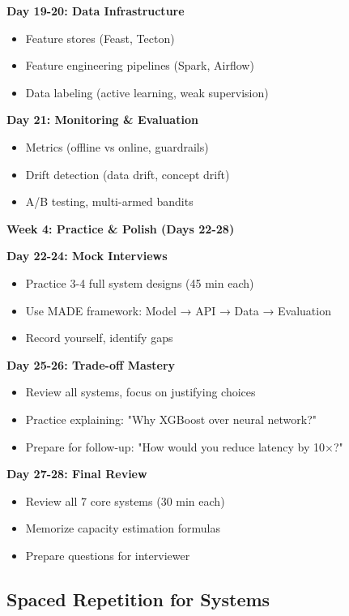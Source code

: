 \documentclass[10pt]{article}
\begin{document}
\textbf{Day 19-20: Data Infrastructure}
\begin{itemize}
\item Feature stores (Feast, Tecton)
\item Feature engineering pipelines (Spark, Airflow)
\item Data labeling (active learning, weak supervision)
\end{itemize}

\textbf{Day 21: Monitoring \& Evaluation}
\begin{itemize}
\item Metrics (offline vs online, guardrails)
\item Drift detection (data drift, concept drift)
\item A/B testing, multi-armed bandits
\end{itemize}

\textbf{Week 4: Practice \& Polish (Days 22-28)}

\textbf{Day 22-24: Mock Interviews}
\begin{itemize}
\item Practice 3-4 full system designs (45 min each)
\item Use MADE framework: Model → API → Data → Evaluation
\item Record yourself, identify gaps
\end{itemize}

\textbf{Day 25-26: Trade-off Mastery}
\begin{itemize}
\item Review all systems, focus on justifying choices
\item Practice explaining: "Why XGBoost over neural network?"
\item Prepare for follow-up: "How would you reduce latency by 10×?"
\end{itemize}

\textbf{Day 27-28: Final Review}
\begin{itemize}
\item Review all 7 core systems (30 min each)
\item Memorize capacity estimation formulas
\item Prepare questions for interviewer
\end{itemize}

\subsection{Spaced Repetition for Systems}
\end{document}
